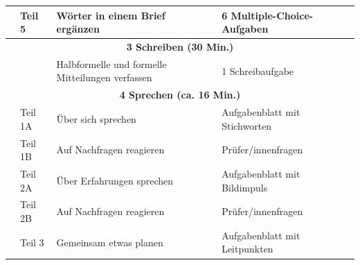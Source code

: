 \documentclass[a4paper]{article}
\begin{document}
\begin{table}[h]
{\begin{tabular}{|l|l|l|l|l|}
                \hline
                & Teil 5        & Wörter in einem Brief ergänzen                                                   & 6 Multiple-Choice-Aufgaben                       &               \\
                \hline
                \multicolumn{5}{|c|}{\textbf{3 Schreiben (30 Min.)}} \\
                \hline
                &               & Halbformelle und formelle Mitteilungen verfassen                                 & 1 Schreibaufgabe                                 &               \\
                \hline
                \multicolumn{5}{|c|}{\textbf{4 Sprechen (ca. 16 Min.)}} \\
                \hline
                & Teil 1A       & Über sich sprechen                                                               & Aufgabenblatt mit Stichworten                    &               \\
                \hline
                & Teil 1B       & Auf Nachfragen reagieren                                                         & Prüfer/innenfragen                               &               \\
                \hline
                & Teil 2A       & Über Erfahrungen sprechen                                                        & Aufgabenblatt mit Bildimpuls                     &               \\
                \hline
                & Teil 2B       & Auf Nachfragen reagieren                                                         & Prüfer/innenfragen                               &               \\
                \hline
                & Teil 3        & Gemeinsam etwas planen                                                           & Aufgabenblatt mit Leitpunkten                    &               \\
                \hline
            \end{tabular}
        }
    \end{table}
\end{document}
